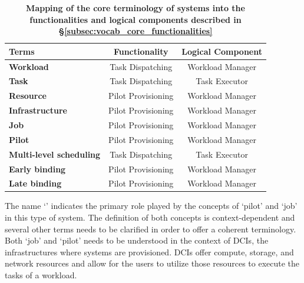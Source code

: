 \documentclass{sig-alternate}
\begin{document}
\begin{table}[t]
 \up
 \centering
 \begin{tabular}{|l|c|c|}
  \hline
    \textbf{Terms} & \textbf{Functionality} & \textbf{Logical Component} \\
  \hline
    \textbf{Workload} & Task Dispatching & Workload Manager \\
  \hline
    \textbf{Task} & Task Dispatching & Task Executor \\
  \hline
    \textbf{Resource} & Pilot Provisioning & Workload Manager \\
  \hline
    \textbf{Infrastructure} & Pilot Provisioning & Workload Manager \\
  \hline
    \textbf{Job} & Pilot Provisioning & Workload Manager \\
  \hline
    \textbf{Pilot} & Pilot Provisioning & Workload Manager \\
  \hline
    \textbf{Multi-level scheduling} & Task Dispatching & Task Executor \\
  \hline
    \textbf{Early binding} & Pilot Provisioning & Workload Manager \\
  \hline
    \textbf{Late binding} & Pilot Provisioning & Workload Manager \\
  \hline
 \end{tabular}
 \caption{\textbf{Mapping of the core terminology of \pilot systems into 
  the functionalities and logical components described in 
  \S\ref{subsec:vocab_core_functionalities}}\up}
 \label{table:terminology}
\end{table}

The name `\pilotjob' indicates the primary role played by the concepts of
`pilot' and `job' in this type of system. The definition of both concepts is
context-dependent and several other terms needs to be clarified in order to
offer a coherent terminology. Both `job' and `pilot' needs to be understood in
the context of DCIs, the infrastructures where \pilotjobs systems are
provisioned. DCIs offer compute, storage, and network resources and
\pilotjobs allow for the users to utilize those resources to execute the tasks
of a workload.
\end{document}
